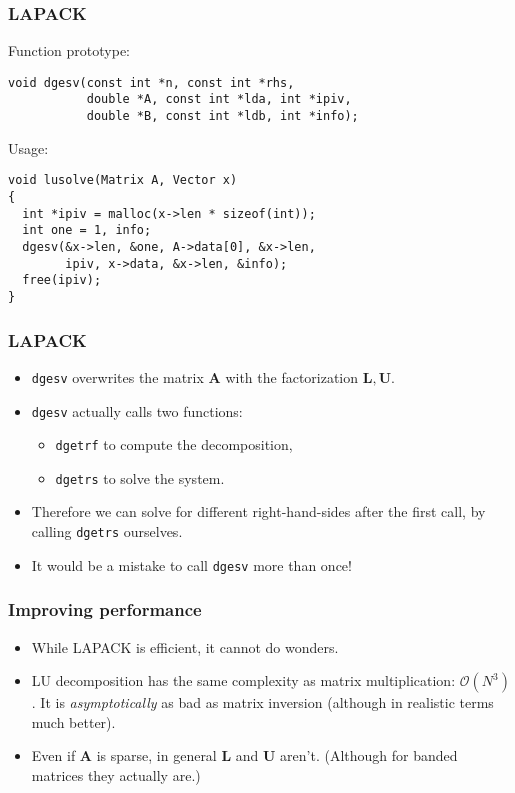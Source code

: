 \begin{frame}[fragile]
  \frametitle{LAPACK}
  Function prototype:
  \begin{lstlisting}[style=c]
void dgesv(const int *n, const int *rhs,
           double *A, const int *lda, int *ipiv,
           double *B, const int *ldb, int *info);
  \end{lstlisting}
  Usage:
  \begin{lstlisting}[style=c]
void lusolve(Matrix A, Vector x)
{
  int *ipiv = malloc(x->len * sizeof(int));
  int one = 1, info;
  dgesv(&x->len, &one, A->data[0], &x->len,
        ipiv, x->data, &x->len, &info);
  free(ipiv);
}
  \end{lstlisting}
\end{frame}

\begin{frame}
  \frametitle{LAPACK}
  \begin{itemize}
  \item \texttt{dgesv} overwrites the matrix $\bm A$ with the factorization
    $\bm L, \bm U$.
  \item \texttt{dgesv} actually calls two functions:
    \begin{itemize}
    \item \texttt{dgetrf} to compute the decomposition,
    \item \texttt{dgetrs} to solve the system.
    \end{itemize}
  \item Therefore we can solve for different right-hand-sides after the first
    call, by calling \texttt{dgetrs} ourselves.
  \item It would be a mistake to call \texttt{dgesv} more than once!
  \end{itemize}
\end{frame}

\begin{frame}
  \frametitle{Improving performance}
  \begin{itemize}
  \item While LAPACK is efficient, it cannot do wonders.
  \item LU decomposition has the same complexity as matrix multiplication:
    $\mathcal{O}(N^3)$. It is \emph{asymptotically} as bad as matrix inversion
    (although in realistic terms much better).
  \item Even if $\bm A$ is sparse, in general $\bm L$ and $\bm U$ aren't.
    (Although for banded matrices they actually are.)
  \end{itemize}
\end{frame}


